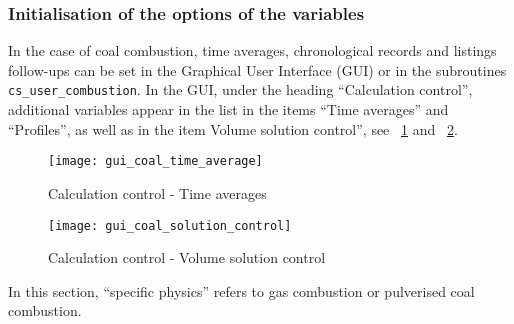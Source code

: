 {{{%
\subsubsection{Initialisation of the options of the variables}
In the case of coal combustion, time averages, chronological records and listings follow-ups can be set in the Graphical User Interface (GUI) or in the subroutines \texttt{cs\_user\_combustion}. In the GUI, under the heading ``Calculation control'', additional variables appear in the list in the items ``Time averages'' and ``Profiles'', as well as in the item Volume solution control'', see \figurename~\ref{fig:t_average-coal} and \figurename~\ref{fig:V_control-coal}.

\begin{figure}[!ht]
\begin{center}
\texttt{[image: gui\_coal\_time\_average]}
\caption{Calculation control - Time averages}
\label{fig:t_average-coal}
\end{center}
\end{figure}

\begin{figure}[!ht]
\begin{center}
\texttt{[image: gui\_coal\_solution\_control]}
\caption{Calculation control - Volume solution control}
\label{fig:V_control-coal}
\end{center}
\end{figure}

In this section, ``specific physics'' refers to gas combustion or
pulverised coal combustion.

}}}
